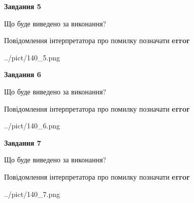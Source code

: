 \documentclass[10pt, ukrainian]{article}
\begin{document}
{\begin {large}
{\begin {center}\textbf{Завдання 5}\end {center}}\par
Що буде виведено за виконання? \par
Повідомлення інтерпретатора про помилку позначати \textbf{error}

\begin{center}
	{../pict/140_5.png}
\end{center}
\newpage

{\begin {center}\textbf{Завдання 6}\end {center}}\par
Що буде виведено за виконання? \par
Повідомлення інтерпретатора про помилку позначати \textbf{error}

\begin{center}
	{../pict/140_6.png}
\end{center}
\newpage

{\begin {center}\textbf{Завдання 7}\end {center}}\par
Що буде виведено за виконання? \par
Повідомлення інтерпретатора про помилку позначати \textbf{error}

\begin{center}
	{../pict/140_7.png}
\end{center}
\newpage

\end {large}}
\end{document}
